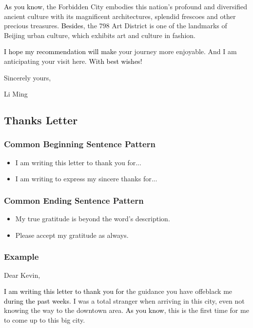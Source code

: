 \documentclass{article}
\begin{document}
\par \textcolor{black}{As you know}, the Forbidden City embodies this nation's profound and diversified ancient culture with its magnificent architectures, splendid frescoes and other precious treasures. \textcolor{black}{Besides}, the 798 Art District is one of the landmarks of Beijing urban culture, which exhibits art and culture in fashion.

\par \textcolor{black}{I hope my recommendation will make} your journey more enjoyable. And I am anticipating your visit here. \textcolor{black}{With best wishes}!

\hfill Sincerely yours,

\hfill Li Ming


\subsection{Thanks Letter}
\label{sec:letter}

\subsubsection{Common Beginning Sentence Pattern}
\label{sec:comm-begnn-sent}
\begin{itemize}
\item I am writing this letter to thank you for...
\item I am writing to express my sincere thanks for...
\end{itemize}

\subsubsection{Common Ending Sentence Pattern}
\label{sec:comm-ending-sent-2}
\begin{itemize}
\item My true gratitude is beyond the word's description.
\item Please accept my gratitude as always.
\end{itemize}

\subsubsection{Example}
\label{sec:example-2}
Dear Kevin,

\par \textcolor{black}{I am writing this letter to thank you for} the guidance you have
offeblack me \textcolor{black}{during the past weeks}. I was a total stranger when arriving in
this city, even not knowing the way to the downtown area. \textcolor{black}{As you know},
this is the first time for me to come up to this big city.
\end{document}
